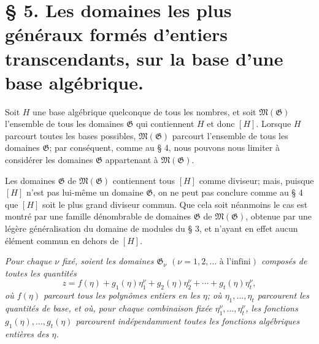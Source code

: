 \section*{\S{} 5. Les domaines les plus généraux formés d'entiers transcendants, sur la base d'une base algébrique.}

Soit $H$ une base algébrique quelconque de tous les nombres, et soit $\mathfrak M(\mathfrak G)$ l'ensemble de tous les domaines $\mathfrak G$ qui contiennent $H$ et donc $[H]$. Lorsque $H$ parcourt toutes les bases possibles, $\mathfrak M(\mathfrak G)$ parcourt l'ensemble de tous les domaines $\mathfrak G$; par conséquent, comme au \S{} 4, nous pouvons nous limiter à considérer les domaines $\mathfrak G$ appartenant à $\mathfrak M(\mathfrak G)$.

Les domaines $\mathfrak G$ de $\mathfrak M(\mathfrak G)$ contiennent tous $[H]$ comme diviseur; mais, puisque $[H]$ n'est pas lui-même un domaine $\mathfrak G$, on ne peut pas conclure comme au \S{} 4 que $[H]$ soit le plus grand diviseur commun. Que cela soit néanmoins le cas est montré par une famille dénombrable de domaines $\mathfrak G$ de $\mathfrak M(\mathfrak G)$, obtenue par une légère généralisation du domaine de modules du \S{} 3, et n'ayant en effet aucun élément commun en dehors de $[H]$.

\emph{Pour chaque $\nu$ fixé, soient les domaines $\mathfrak G_\nu$ $(\nu=1,2,\ldots\text{ à l'infini})$ composés de toutes les quantités}
\begin{equation}
z=f(\eta)+g_1(\eta)\eta_1^\nu+g_2(\eta)\eta_2^\nu+\cdots+g_t(\eta)\eta_t^\nu,
\tag{1}
\end{equation}
\emph{où $f(\eta)$ parcourt tous les polynômes entiers en les $\eta$; où $\eta_1,\ldots,\eta_t$ parcourent les quantités de base, et où, pour chaque combinaison fixée $\eta_1^\nu,\ldots,\eta_t^\nu$, les fonctions $g_1(\eta),\ldots,g_t(\eta)$ parcourent indépendamment toutes les fonctions algébriques entières des $\eta$.}

